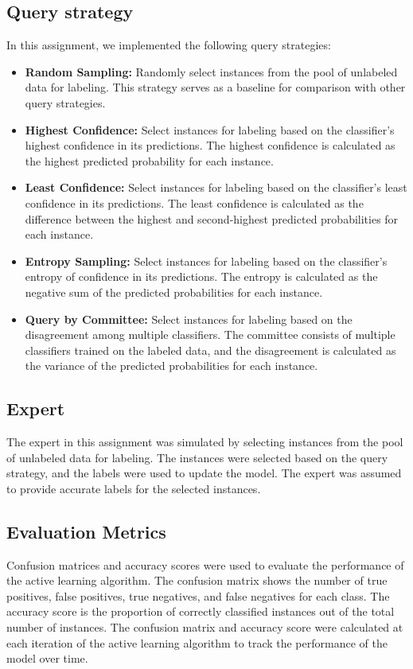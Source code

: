 \subsection{Query strategy}
In this assignment, we implemented the following query strategies:
\begin{itemize}
    \item \textbf{Random Sampling:} Randomly select instances from the pool of unlabeled data for labeling. This strategy serves as a baseline for comparison with other query strategies.
    \item \textbf{Highest Confidence:} Select instances for labeling based on the classifier's highest confidence in its predictions. The highest confidence is calculated as the highest predicted probability for each instance.
    \item \textbf{Least Confidence:} Select instances for labeling based on the classifier's least confidence in its predictions. The least confidence is calculated as the difference between the highest and second-highest predicted probabilities for each instance.    
    \item \textbf{Entropy Sampling:} Select instances for labeling based on the classifier's entropy of confidence in its predictions. The entropy is calculated as the negative sum of the predicted probabilities for each instance.
    \item \textbf{Query by Committee:} Select instances for labeling based on the disagreement among multiple classifiers. The committee consists of multiple classifiers trained on the labeled data, and the disagreement is calculated as the variance of the predicted probabilities for each instance.
\end{itemize}

\subsection{Expert}
The expert in this assignment was simulated by selecting instances from the pool of unlabeled data for labeling. The instances were selected based on the query strategy, and the labels were used to update the model. The expert was assumed to provide accurate labels for the selected instances.


\subsection{Evaluation Metrics}
Confusion matrices and accuracy scores were used to evaluate the performance of the active learning algorithm. The confusion matrix shows the number of true positives, false positives, true negatives, and false negatives for each class.
The accuracy score is the proportion of correctly classified instances out of the total number of instances. The confusion matrix and accuracy score were calculated at each iteration of the active learning algorithm to track the performance of the model over time.